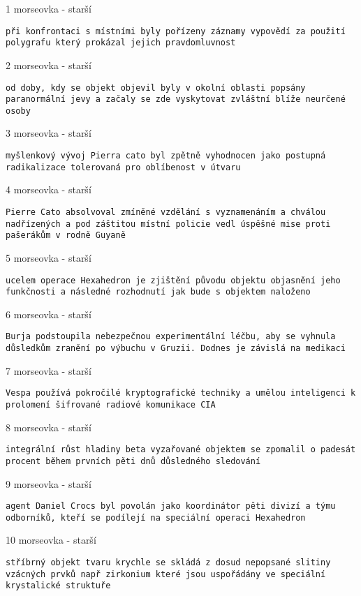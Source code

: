 \documentclass[a4paper, 10pt]{article}
\newcommand{\morse}[1]{\noindent\lstinline[breaklines, breakindent=0mm]|#1|}
\newcommand{\mo}[1]{\noindent \Large #1 morseovka - starší}
\begin{document}
	\mo{1}
	
	\morse{při konfrontaci s místními byly pořízeny záznamy vypovědí za použití polygrafu který prokázal jejich pravdomluvnost}
	
	\mo{2}
	
	\morse{od doby, kdy se objekt objevil byly v okolní oblasti popsány paranormální jevy a začaly se zde vyskytovat zvláštní blíže neurčené osoby}
	
	\mo{3}
	
	\morse{myšlenkový vývoj Pierra cato byl zpětně vyhodnocen jako postupná radikalizace tolerovaná pro oblíbenost v útvaru}
	
	\mo{4}
	
	\morse{Pierre Cato absolvoval zmíněné vzdělání s vyznamenáním a chválou nadřízených a pod záštitou místní policie vedl úspěšné mise proti pašerákům v rodně Guyaně}
	
	\pagebreak
	\mo{5}
	
	\morse{ucelem operace Hexahedron je zjištění původu objektu objasnění jeho funkčnosti a následné rozhodnutí jak bude s objektem naloženo}
	
	\mo{6}
	
	\morse{Burja podstoupila nebezpečnou experimentální léčbu, aby se vyhnula důsledkům zranění po výbuchu v Gruzii. Dodnes je závislá na medikaci}
	
	\mo{7}
	
	\morse{Vespa používá pokročilé kryptografické techniky a umělou inteligenci k prolomení šifrované radiové komunikace CIA}
	
	\mo{8}
	
	\morse{integrální růst hladiny beta vyzařované objektem se zpomalil o padesát procent během prvních pěti dnů důsledného sledování}
	
	\pagebreak
	\mo{9}
	
	\morse{agent Daniel Crocs byl povolán jako koordinátor pěti divizí a týmu odborníků, kteří se podílejí na speciální operaci Hexahedron}
	
	\mo{10}
	
	\morse{stříbrný objekt tvaru krychle se skládá z dosud nepopsané slitiny vzácných prvků např zirkonium které jsou uspořádány ve speciální krystalické struktuře}
\end{document}
